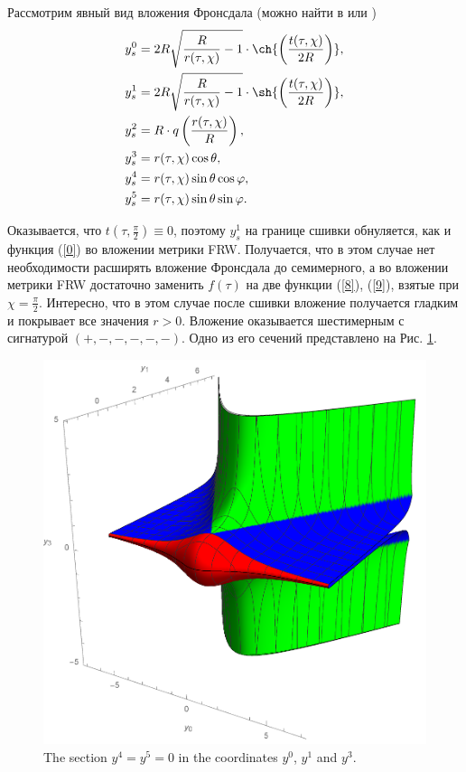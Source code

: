 \documentclass[12pt]{article}
\begin{document}
Рассмотрим явный вид вложения Фронсдала (можно найти в \cite{statja27,statja29} или \cite{frons})
\begin{align}
\label{8}	y^0_s & = 2 R \sqrt{\frac{R}{r(\tau, \chi)}-1} \cdot \ch{\left( \frac{t(\tau, \chi)}{2 R}\right)},  \\
	y^1_s & = 2 R \sqrt{\frac{R}{r(\tau, \chi)}-1} \cdot \sh{\left( \frac{t(\tau, \chi)}{2 R}\right)},  \\
\label{9}	y^2_s & = R \cdot q \left( \frac{r(\tau, \chi)}{R} \right), \\
	y^3_s &= r(\tau, \chi) \cos{\theta},  \\
	y^4_s &= r(\tau, \chi) \sin{\theta} \cos{\varphi},  \\
	y^5_s &= r(\tau, \chi) \sin{\theta} \sin{\varphi}.
\end{align}

Оказывается, что $t(\tau, \frac{\pi}{2}) \equiv 0$, поэтому $y_s^1$ на границе сшивки обнуляется, как и функция (\ref{0}) во вложении метрики FRW. Получается, что в этом случае нет необходимости расширять вложение Фронсдала до семимерного, а во вложении метрики FRW достаточно заменить $f(\tau)$ на две функции  (\ref{8}), (\ref{9}), взятые при $\chi = \frac{\pi}{2}$. Интересно, что в этом случае после сшивки вложение получается гладким и покрывает все значения $r>0$. Вложение оказывается шестимерным с сигнатурой $(+, -, -, -, -, -)$. Одно из его сечений представлено на Рис. \ref{pic_emb}.

\begin{figure}[h!]
	\centering
	\includegraphics[width=0.55\linewidth]{col-emb-15.pdf}
	\caption{\label{pic_emb}The section $y^4 = y^5 = 0$ in the coordinates $ y^0 $, $ y^1 $ and $ y^3 $.}
\end{figure}



\end{document}
